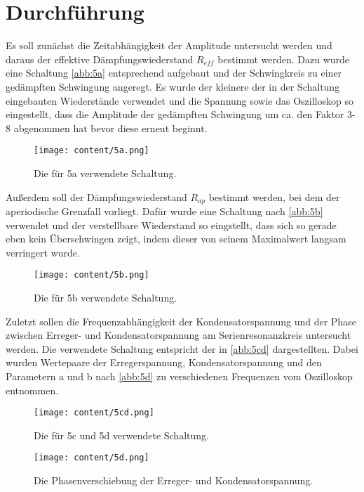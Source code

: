 \section{Durchführung}
\label{sec:Durchführung}
Es soll zunächst die Zeitabhängigkeit der Amplitude untersucht werden und daraus der effektive Dämpfungswiederstand $R_{eff}$ bestimmt werden.
Dazu wurde eine Schaltung \autoref{abb:5a} entsprechend aufgebaut und der Schwingkreis zu einer gedämpften Schwingung angeregt.
Es wurde der kleinere der in der Schaltung eingebauten Wiederstände verwendet und die Spannung sowie das Oszilloskop so eingestellt,
dass die Amplitude der gedämpften Schwingung um ca. den Faktor 3-8 abgenommen hat bevor diese erneut beginnt.
\begin{figure}[H]
    \centering
    \texttt{[image: content/5a.png]}
    \caption{Die für 5a verwendete Schaltung. \cite{sample}}
    \label{abb:5a}
\end{figure}
\noindent Außerdem soll der Dämpfungswiederstand $R_{ap}$ bestimmt werden, bei dem der aperiodische Grenzfall vorliegt.
Dafür wurde eine Schaltung nach \autoref{abb:5b} verwendet und der verstellbare Wiederstand so eingstellt, dass sich
so gerade eben kein Überschwingen zeigt, indem dieser von seinem Maximalwert langsam verringert wurde.
\begin{figure}[H]
    \centering
    \texttt{[image: content/5b.png]}
    \caption{Die für 5b verwendete Schaltung. \cite{sample}}
    \label{abb:5b}
\end{figure}
\noindent Zuletzt sollen die Frequenzabhängigkeit der Kondensatorspannung und der Phase zwischen Erreger- und Kondensatorspannung
am Serienresonanzkreis untersucht werden. Die verwendete Schaltung entspricht der in \autoref{abb:5cd} dargestellten. Dabei wurden
Wertepaare der Erregerspannung, Kondensatorspannung und den Parametern a und b nach \autoref{abb:5d} zu verschiedenen Frequenzen vom Oszilloskop
entnommen.
\begin{figure}[H]
    \centering
    \texttt{[image: content/5cd.png]}
    \caption{Die für 5c und 5d verwendete Schaltung. \cite{sample}}
    \label{abb:5cd}
\end{figure}
\begin{figure}[H]
    \centering
    \texttt{[image: content/5d.png]}
    \caption{Die Phasenverschiebung der Erreger- und Kondensatorspannung. \cite{V353}}
    \label{abb:5d}
\end{figure}
